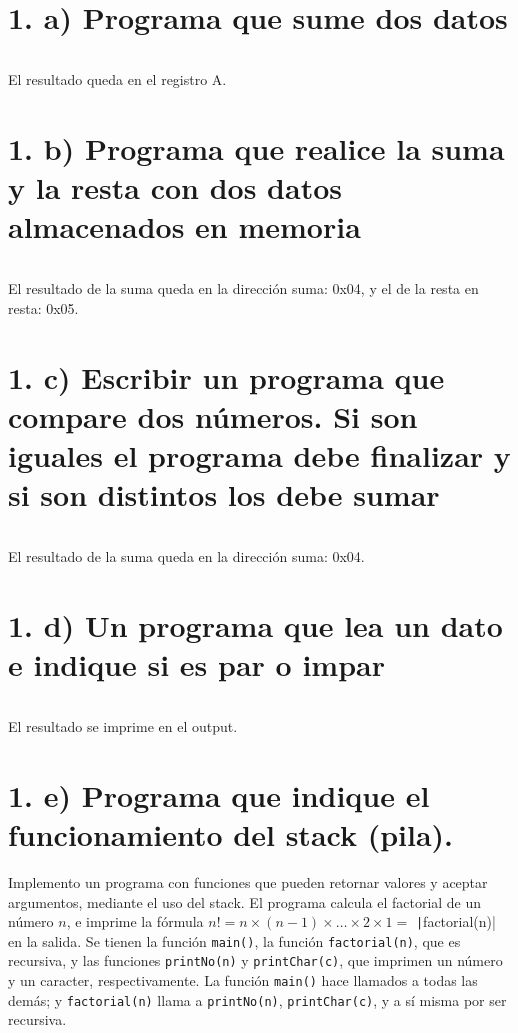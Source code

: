 \documentclass{article}
\begin{document}


\section*{1. a) Programa que sume dos datos}

\inputminted{nasm}{./code/1a.txt}

El resultado queda en el registro A.

\section*{1. b) Programa que realice la suma y la resta con dos datos almacenados en memoria}

\inputminted{nasm}{./code/1b.txt}

El resultado de la suma queda en la dirección suma: 0x04, y el de la resta en resta: 0x05.

\section*{1. c) Escribir un programa que compare dos números. Si son iguales el programa debe finalizar y si son distintos los debe sumar}

\inputminted{nasm}{./code/1c.txt}

El resultado de la suma queda en la dirección suma: 0x04.

\section*{1. d) Un programa que lea un dato e indique si es par o impar}

\inputminted{nasm}{./code/1d.txt}

El resultado se imprime en el output.

\section*{1. e) Programa que indique el funcionamiento del stack (pila).}

Implemento un programa con funciones que pueden retornar valores y aceptar argumentos, mediante el uso del stack. El programa calcula el factorial de un número $n$, e imprime la fórmula $n! = n \times (n-1) \times \dots \times 2 \times 1 =$ \texttt|factorial(n)| en la salida. Se tienen la función \texttt{main()}, la función \texttt{factorial(n)}, que es recursiva, y las funciones \texttt{printNo(n)} y \texttt{printChar(c)}, que imprimen un número y un caracter, respectivamente. La función \texttt{main()} hace llamados a todas las demás; y \texttt{factorial(n)} llama a \texttt{printNo(n)}, \texttt{printChar(c)}, y a sí misma por ser recursiva. 
\end{document}
